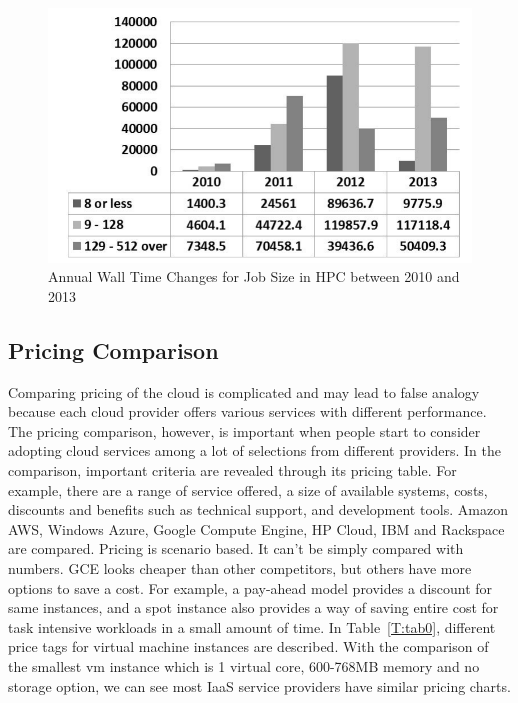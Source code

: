 \documentclass{sig-alternate}
\begin{document}
\begin{figure}[h!]
  \centering
    \includegraphics[width=1.0\columnwidth]{images/bigdatainhpc.pdf} 
  \caption{Annual Wall Time Changes for Job Size in HPC between 2010 and 2013}\label{F:bigdatainhpc} 
\end{figure} 

\subsection{Pricing Comparison}

Comparing pricing of the cloud is complicated and may lead to false analogy because each cloud provider offers various services with different performance. The pricing comparison, however, is important when people start to consider adopting cloud services among a lot of selections from different providers. In the comparison, important criteria are revealed through its pricing table. For example, there are a range of service offered, a size of available systems, costs, discounts and benefits such as technical support, and development tools. Amazon AWS, Windows Azure, Google Compute Engine, HP Cloud, IBM and Rackspace are compared. Pricing is scenario based. It can't be simply compared with numbers. GCE looks cheaper than other competitors, but others have more options to save a cost. For example, a pay-ahead model provides a discount for same instances, and a spot instance also provides a way of saving entire cost for task intensive workloads in a small amount of time. In Table~\ref{T:tab0}, different price tags for virtual machine instances are described. With the comparison of the smallest vm instance which is 1 virtual core, 600-768MB memory and no storage option, we can see most IaaS service providers have similar pricing charts.
\end{document}
